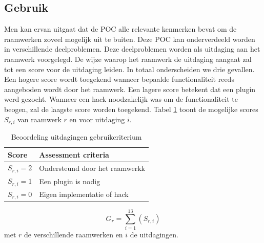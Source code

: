 \subsection{Gebruik}
\label{sec:vergelijking-gebruik}
Men kan ervan uitgaat dat de POC alle relevante kenmerken bevat om de raamwerken zoveel mogelijk uit te buiten. 
Deze POC kan onderverdeeld worden in verschillende deelproblemen.
Deze deelproblemen worden als uitdaging aan het raamwerk voorgelegd.
De wijze waarop het raamwerk de uitdaging aangaat zal tot een score voor de uitdaging leiden.
In totaal onderscheiden we drie gevallen.
Een hogere score wordt toegekend wanneer bepaalde functionaliteit reeds aangeboden wordt door het raamwerk. 
Een lagere score betekent dat een plugin werd gezocht. 
Wanneer een hack noodzakelijk was om de functionaliteit te beogen, zal de laagste score worden toegekend.
Tabel \ref{tabel:scores-uitdagingen} toont de mogelijke scores $S_{r,i}$ van raamwerk $r$ en voor uitdaging $i$.
\begin{table}[h]	
  \centering
  \begin{tabular}{ll}
    \toprule
    \textbf{Score} & \textbf{Assessment criteria}\\
    \midrule
    $S_{r,i} = 2$ & Ondersteund door het raamwerkk\\
    $S_{r,i} = 1$ & Een plugin is nodig\\
    $S_{r,i} = 0$ & Eigen implementatie of hack\\
    \bottomrule
  \end{tabular}
  \caption{Beoordeling uitdagingen gebruikcriterium}
  \label{tabel:scores-uitdagingen}
\end{table}
\begin{equation}
  G_r = \sum_{i=1}^{13}{\left(S_{r,i}\right)}
  \label{eq:gebruik}
\end{equation}
met $r$ de verschillende raamwerken en $i$ de uitdagingen.


